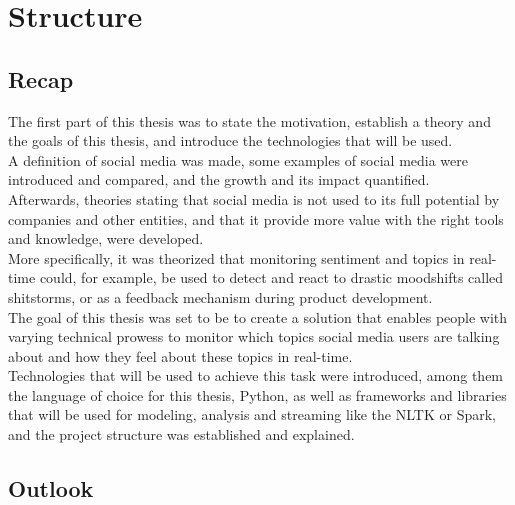 
\chapter{Structure}
\label{ch:structure}

\section{Recap}
\label{sec:recap}

The first part of this thesis was to state the motivation,
establish a theory and the goals of this thesis, and introduce the technologies that will be used.\\
A definition of social media was made,
some examples of social media were introduced and compared,
and the growth and its impact quantified.\\
Afterwards, theories stating that social media is not used to its full potential by companies and other entities,
and that it provide more value with the right tools and knowledge, were developed. \\
More specifically, it was theorized that monitoring sentiment and topics in real-time could, for example,
be used to detect and react to drastic moodshifts called shitstorms, or as a feedback mechanism during product development.\\
The goal of this thesis was set to be to create a solution that enables people with varying technical prowess to monitor
which topics social media users are talking about and how they feel about these topics in real-time.\\
Technologies that will be used to achieve this task were introduced, among them the language of choice for this thesis,
Python, as well as frameworks and libraries that will be used for modeling, analysis and streaming like the NLTK or Spark,
and the project structure was established and explained.

\section{Outlook}
\label{sec:outlook}

